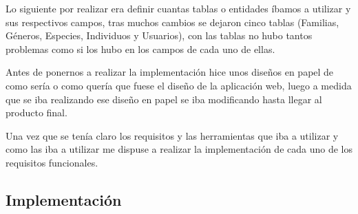 Lo siguiente por realizar era definir cuantas tablas o entidades íbamos a utilizar y sus respectivos campos, tras muchos cambios se dejaron cinco tablas (Familias, Géneros, Especies, Individuos y Usuarios), con las tablas no hubo tantos problemas como si los hubo en los campos de cada uno de ellas.

Antes de ponernos a realizar la implementación hice unos diseños en papel de como sería o como quería que fuese el diseño de la aplicación web, luego a medida que se iba realizando ese diseño en papel se iba modificando hasta llegar al producto final.

Una vez que se tenía claro los requisitos y las herramientas que iba a utilizar y como las iba a utilizar me dispuse a realizar la implementación de cada uno de los requisitos funcionales.

\subsection{Implementación}

